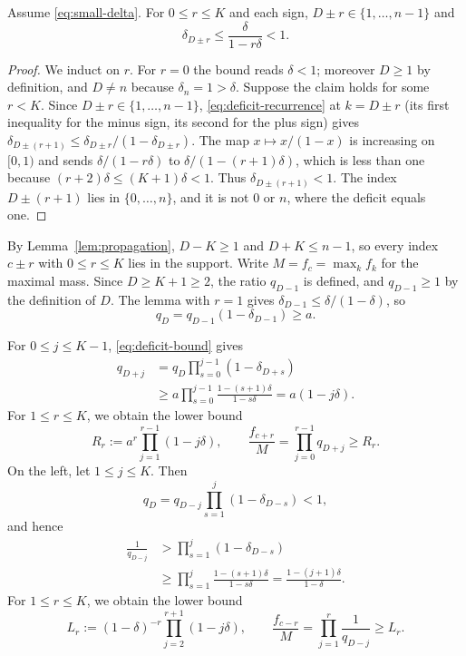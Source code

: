 \documentclass[ECP,preprint]{ejpecp}
\begin{document}
\begin{lemma}\label{lem:propagation}
  Assume \eqref{eq:small-delta}. For $0\leq r\leq K$ and each sign,
  $D\pm r\in\{1,\ldots,n-1\}$ and
  \begin{equation}\label{eq:deficit-bound}
    \delta_{D\pm r}\leq\frac{\delta}{1-r\delta}<1.
  \end{equation}
\end{lemma}

\begin{proof}
  We induct on $r$. For $r=0$ the bound reads $\delta<1$; moreover $D\geq1$
  by definition, and $D\neq n$ because $\delta_n=1>\delta$. Suppose the claim
  holds for some $r<K$. Since $D\pm r\in\{1,\ldots,n-1\}$,
  \eqref{eq:deficit-recurrence} at $k=D\pm r$ (its first inequality for the
  minus sign, its second for the plus sign) gives
  $\delta_{D\pm(r+1)}\leq\delta_{D\pm r}/(1-\delta_{D\pm r})$. The map
  $x\mapsto x/(1-x)$ is increasing on $[0,1)$ and sends $\delta/(1-r\delta)$
  to $\delta/(1-(r+1)\delta)$, which is less than one because
  $(r+2)\delta\leq(K+1)\delta<1$. Thus $\delta_{D\pm(r+1)}<1$. The index
  $D\pm(r+1)$ lies in $\{0,\ldots,n\}$, and it is not $0$ or $n$, where the
  deficit equals one.
\end{proof}

By Lemma~\ref{lem:propagation}, $D-K\geq1$ and $D+K\leq n-1$, so every index
$c\pm r$ with $0\leq r\leq K$ lies in the support. Write $M=f_c=\max_k f_k$
for the maximal mass. Since $D\geq K+1\geq2$, the ratio $q_{D-1}$ is
defined, and $q_{D-1}\geq1$ by the definition of $D$.
The lemma with $r=1$ gives $\delta_{D-1}\leq\delta/(1-\delta)$, so
\[
  q_D=q_{D-1}(1-\delta_{D-1})\geq a.
\]

For $0\leq j\leq K-1$, \eqref{eq:deficit-bound} gives
\[
\begin{aligned}
  q_{D+j}
  &=q_D\prod_{s=0}^{j-1}(1-\delta_{D+s})\\
  &\geq a\prod_{s=0}^{j-1}
    \frac{1-(s+1)\delta}{1-s\delta}
   =a(1-j\delta).
\end{aligned}
\]
For $1\leq r\leq K$, we obtain the lower bound
\begin{equation}\label{eq:right-mass-bound}
  R_r:=a^r\prod_{j=1}^{r-1}(1-j\delta),
  \qquad
  \frac{f_{c+r}}M=\prod_{j=0}^{r-1}q_{D+j}\geq R_r.
\end{equation}
On the left, let $1\leq j\leq K$. Then
\[
  q_D=q_{D-j}\prod_{s=1}^j(1-\delta_{D-s})<1,
\]
and hence
\[
\begin{aligned}
  \frac1{q_{D-j}}
  &>\prod_{s=1}^j(1-\delta_{D-s})\\
  &\geq\prod_{s=1}^j
    \frac{1-(s+1)\delta}{1-s\delta}
   =\frac{1-(j+1)\delta}{1-\delta}.
\end{aligned}
\]
For $1\leq r\leq K$, we obtain the lower bound
\begin{equation}\label{eq:left-mass-bound}
  L_r:=(1-\delta)^{-r}
  \prod_{j=2}^{r+1}(1-j\delta),
  \qquad
  \frac{f_{c-r}}M=\prod_{j=1}^r\frac1{q_{D-j}}\geq L_r.
\end{equation}
\end{document}
